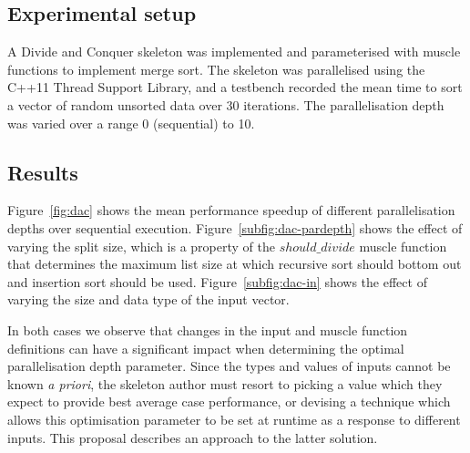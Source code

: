 \subsection{Experimental setup}
A Divide and Conquer skeleton was implemented and parameterised with
muscle functions to implement merge sort. The skeleton was
parallelised using the C++11 Thread Support Library, and a testbench
recorded the mean time to sort a vector of random unsorted data over
30 iterations. The parallelisation depth was varied over a range 0
(sequential) to 10.

\subsection{Results}
Figure~\ref{fig:dac} shows the mean performance speedup of different
parallelisation depths over sequential
execution. Figure~\ref{subfig:dac-pardepth} shows the effect of
varying the split size, which is a property of the $should\_divide$
muscle function that determines the maximum list size at which
recursive sort should bottom out and insertion sort should be
used. Figure~\ref{subfig:dac-in} shows the effect of varying the size
and data type of the input vector.

In both cases we observe that changes in the input and muscle function
definitions can have a significant impact when determining the optimal
parallelisation depth parameter. Since the types and values of inputs
cannot be known \emph{a priori}, the skeleton author must resort to
picking a value which they expect to provide best average case
performance, or devising a technique which allows this optimisation
parameter to be set at runtime as a response to different inputs. This
proposal describes an approach to the latter solution.

